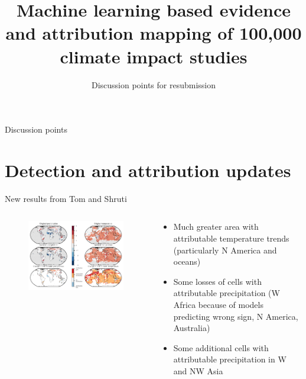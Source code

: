 \documentclass[9pt,aspectratio=169]{beamer}
\title[Climate Impacts]{Machine learning based evidence and attribution mapping of 100,000 climate impact studies}
\subtitle{Discussion points for resubmission}
\begin{document}
	
\begin{frame}
	\titlepage
\end{frame}

\begin{frame}{Discussion points}
\tableofcontents[]
\end{frame}


\section{Detection and attribution updates}

\begin{frame}{New results from Tom and Shruti}

\begin{columns}
	\begin{column}{0.682\linewidth}
		\begin{figure}
			\includegraphics[width=\linewidth]{../plots/attribution_changes.pdf}
		\end{figure}
		
	\end{column}
	\begin{column}{0.318\linewidth}
		\begin{itemize}
			\item Much greater area with attributable temperature trends (particularly N America and oceans)
			\item Some losses of cells with attributable precipitation  (W Africa because of models predicting wrong sign, N America, Australia)
			\item Some additional cells with attributable precipitation in W and NW Asia
		\end{itemize}
	\end{column}
\end{columns}

\end{frame}
\end{document}
